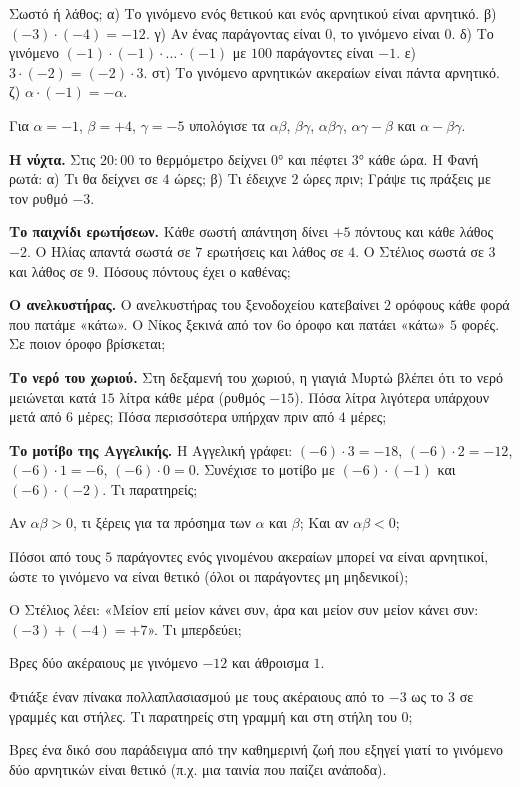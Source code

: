 \ex Σωστό ή λάθος; α) Το γινόμενο ενός θετικού και ενός αρνητικού είναι αρνητικό. \quad β) $(-3)\cdot(-4)=-12$. \quad γ) Αν ένας παράγοντας είναι $0$, το γινόμενο είναι $0$. \quad δ) Το γινόμενο $(-1)\cdot(-1)\cdot\ldots\cdot(-1)$ με $100$ παράγοντες είναι $-1$. \quad ε) $3\cdot(-2)=(-2)\cdot3$. \quad στ) Το γινόμενο αρνητικών ακεραίων είναι πάντα αρνητικό. \quad ζ) $\alpha\cdot(-1)=-\alpha$.

\ex Για $\alpha=-1$, $\beta=+4$, $\gamma=-5$ υπολόγισε τα $\alpha\beta$, $\beta\gamma$, $\alpha\beta\gamma$, $\alpha\gamma-\beta$ και $\alpha-\beta\gamma$.


\ex \textbf{Η νύχτα.} Στις $20{:}00$ το θερμόμετρο δείχνει $0$° και πέφτει $3$° κάθε ώρα. Η Φανή ρωτά: α) Τι θα δείχνει σε $4$ ώρες; β) Τι έδειχνε $2$ ώρες πριν; Γράψε τις πράξεις με τον ρυθμό $-3$.

\ex \textbf{Το παιχνίδι ερωτήσεων.} Κάθε σωστή απάντηση δίνει $+5$ πόντους και κάθε λάθος $-2$. Ο Ηλίας απαντά σωστά σε $7$ ερωτήσεις και λάθος σε $4$. Ο Στέλιος σωστά σε $3$ και λάθος σε $9$. Πόσους πόντους έχει ο καθένας;

\ex \textbf{Ο ανελκυστήρας.} Ο ανελκυστήρας του ξενοδοχείου κατεβαίνει $2$ ορόφους κάθε φορά που πατάμε «κάτω». Ο Νίκος ξεκινά από τον $6$ο όροφο και πατάει «κάτω» $5$ φορές. Σε ποιον όροφο βρίσκεται;

\ex \textbf{Το νερό του χωριού.} Στη δεξαμενή του χωριού, η γιαγιά Μυρτώ βλέπει ότι το νερό μειώνεται κατά $15$ λίτρα κάθε μέρα (ρυθμός $-15$). Πόσα λίτρα λιγότερα υπάρχουν μετά από $6$ μέρες; Πόσα περισσότερα υπήρχαν πριν από $4$ μέρες;

\ex \textbf{Το μοτίβο της Αγγελικής.} Η Αγγελική γράφει: $(-6)\cdot3=-18$, $(-6)\cdot2=-12$, $(-6)\cdot1=-6$, $(-6)\cdot0=0$. Συνέχισε το μοτίβο με $(-6)\cdot(-1)$ και $(-6)\cdot(-2)$. Τι παρατηρείς;


\ex Αν $\alpha\beta>0$, τι ξέρεις για τα πρόσημα των $\alpha$ και $\beta$; Και αν $\alpha\beta<0$;

\ex Πόσοι από τους $5$ παράγοντες ενός γινομένου ακεραίων μπορεί να είναι αρνητικοί, ώστε το γινόμενο να είναι θετικό (όλοι οι παράγοντες μη μηδενικοί);

\ex Ο Στέλιος λέει: «Μείον επί μείον κάνει συν, άρα και μείον συν μείον κάνει συν: $(-3)+(-4)=+7$». Τι μπερδεύει;

\ex Βρες δύο ακέραιους με γινόμενο $-12$ και άθροισμα $1$.


\ex Φτιάξε έναν πίνακα πολλαπλασιασμού με τους ακέραιους από το $-3$ ως το $3$ σε γραμμές και στήλες. Τι παρατηρείς στη γραμμή και στη στήλη του $0$;

\ex Βρες ένα δικό σου παράδειγμα από την καθημερινή ζωή που εξηγεί γιατί το γινόμενο δύο αρνητικών είναι θετικό (π.χ. μια ταινία που παίζει ανάποδα).
